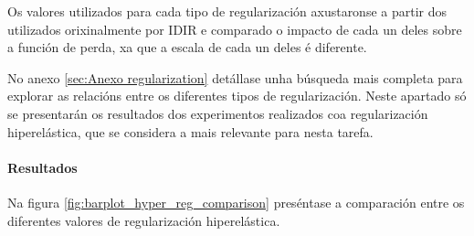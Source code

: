 Os valores utilizados para cada tipo de regularización axustaronse a partir dos utilizados orixinalmente por IDIR e comparado o impacto de cada un deles sobre a función de perda, xa que a escala de cada un deles é diferente.

No anexo \ref{sec:Anexo regularization} detállase unha búsqueda mais completa para explorar as relacións entre os diferentes tipos de regularización.
Neste apartado só se presentarán os resultados dos experimentos realizados coa regularización hiperelástica, que se considera a mais relevante para nesta tarefa.

\paragraph{Resultados}
\label{par:Resultados-regularization}

Na figura \ref{fig:barplot_hyper_reg_comparison} preséntase a comparación entre os diferentes valores de regularización hiperelástica.

